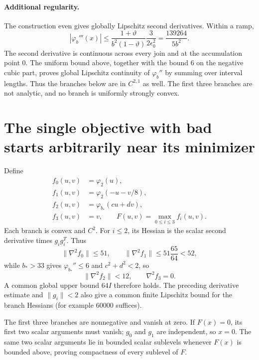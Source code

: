 \paragraph{Additional regularity.}
The construction even gives globally Lipschitz second derivatives. Within a ramp,
\[
 |\varphi_b'''(x)|
 \le\frac{1+\vartheta}{b^2(1-\vartheta)}
       \frac{3}{2\epsilon_0^2}
 =\frac{139264}{5b^2}.
\]
The second derivative is continuous across every join and at the accumulation point $0$. The uniform bound above, together with the bound $6$ on the negative cubic part, proves global Lipschitz continuity of $\varphi_b''$ by summing over interval lengths. Thus the branches below are in $C^{2,1}$ as well. The first three branches are not analytic, and no branch is uniformly strongly convex.


\setcounter{section}{4}
\setcounter{theorem}{1}
\setcounter{lemma}{2}
\setcounter{corollary}{0}
\setcounter{proposition}{0}
\setcounter{remark}{0}
\setcounter{equation}{11}


\section{The single objective with bad starts arbitrarily near its minimizer}
Define
\begin{equation}\label{D:fullobjective}
\begin{split}
 f_0(u,v)&=\varphi_2(u),\\
 f_1(u,v)&=\varphi_2(-u-v/8),\\
 f_2(u,v)&=\varphi_{b_*}(cu+dv),\\
 f_3(u,v)&=v,\qquad F(u,v)=\max_{0\le i\le3}f_i(u,v).
\end{split}
\end{equation}
Each branch is convex and $C^2$. For $i\le2$, its Hessian is the scalar second derivative times $g_i g_i^T$. Thus
\[
 \|\nabla^2f_0\|\le51,\qquad
 \|\nabla^2f_1\|\le51\frac{65}{64}<52,
\]
while $b_*>33$ gives $\varphi_{b_*}''\le6$ and $c^2+d^2<2$, so
\[
 \|\nabla^2f_2\|<12,\qquad\nabla^2f_3=0.
\]
A common global upper bound $64I$ therefore holds. The preceding derivative estimate and $\|g_i\|<2$ also give a common finite Lipschitz bound for the branch Hessians (for example $60000$ suffices).

The first three branches are nonnegative and vanish at zero. If $F(x)=0$, its first two scalar arguments must vanish; $g_0$ and $g_1$ are independent, so $x=0$. The same two scalar arguments lie in bounded scalar sublevels whenever $F(x)$ is bounded above, proving compactness of every sublevel of $F$.

